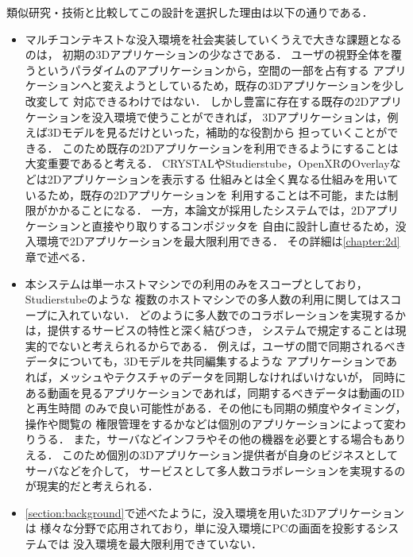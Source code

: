 類似研究・技術と比較してこの設計を選択した理由は以下の通りである．
\begin{itemize}
  \item マルチコンテキストな没入環境を社会実装していくうえで大きな課題となるのは，
        初期の3Dアプリケーションの少なさである．
        ユーザの視野全体を覆うというパラダイムのアプリケーションから，空間の一部を占有する
        アプリケーションへと変えようとしているため，既存の3Dアプリケーションを少し改変して
        対応できるわけではない．
        しかし豊富に存在する既存の2Dアプリケーションを没入環境で使うことができれば，
        3Dアプリケーションは，例えば3Dモデルを見るだけといった，補助的な役割から
        担っていくことができる．
        このため既存の2Dアプリケーションを利用できるようにすることは大変重要であると考える．
        CRYSTALやStudierstube，OpenXRのOverlayなどは2Dアプリケーションを表示する
        仕組みとは全く異なる仕組みを用いているため，既存の2Dアプリケーションを
        利用することは不可能，または制限がかかることになる．
        一方，本論文が採用したシステムでは，2Dアプリケーションと直接やり取りするコンポジッタを
        自由に設計し直せるため，没入環境で2Dアプリケーションを最大限利用できる．
        その詳細は\ref{chapter:2d}章で述べる．

  \item 本システムは単一ホストマシンでの利用のみをスコープとしており，Studierstubeのような
        複数のホストマシンでの多人数の利用に関してはスコープに入れていない．
        どのように多人数でのコラボレーションを実現するかは，提供するサービスの特性と深く結びつき，
        システムで規定することは現実的でないと考えられるからである．
        例えば，ユーザの間で同期されるべきデータについても，3Dモデルを共同編集するような
        アプリケーションであれば，メッシュやテクスチャのデータを同期しなければいけないが，
        同時にある動画を見るアプリケーションであれば，同期するべきデータは動画のIDと再生時間
        のみで良い可能性がある．その他にも同期の頻度やタイミング，操作や閲覧の
        権限管理をするかなどは個別のアプリケーションによって変わりうる．
        また，サーバなどインフラやその他の機器を必要とする場合もありえる．
        このため個別の3Dアプリケーション提供者が自身のビジネスとしてサーバなどを介して，
        サービスとして多人数コラボレーションを実現するのが現実的だと考えられる．

  \item \ref{section:background}で述べたように，没入環境を用いた3Dアプリケーションは
        様々な分野で応用されており，単に没入環境にPCの画面を投影するシステムでは
        没入環境を最大限利用できていない．
\end{itemize}

